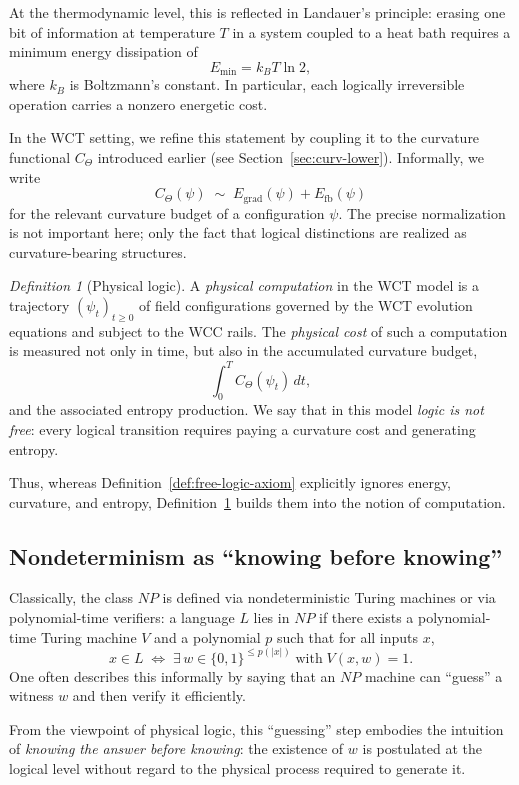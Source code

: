 \documentclass[12pt]{article}
\theoremstyle{remark}
\newtheorem{definition}[theorem]{Definition}
\begin{document}
At the thermodynamic level, this is reflected in Landauer's
principle: erasing one bit of information at temperature $T$ in a
system coupled to a heat bath requires a minimum energy dissipation of
\[
  E_{\min} = k_B T \ln 2,
\]
where $k_B$ is Boltzmann's constant. In particular, each logically
irreversible operation carries a nonzero energetic cost.

In the WCT setting, we refine this statement by coupling it to the
curvature functional $C_\Theta$ introduced earlier (see
Section~\ref{sec:curv-lower}). Informally, we write
\[
  C_\Theta(\psi) \;\sim\; E_{\mathrm{grad}}(\psi) + E_{\mathrm{fb}}(\psi)
\]
for the relevant curvature budget of a configuration $\psi$. The
precise normalization is not important here; only the fact that
logical distinctions are realized as curvature-bearing structures.

\begin{definition}[Physical logic]
\label{def:physical-logic}
A \emph{physical computation} in the WCT model is a trajectory
$(\psi_t)_{t \ge 0}$ of field configurations governed by the WCT
evolution equations and subject to the WCC rails. The \emph{physical
cost} of such a computation is measured not only in time, but also in
the accumulated curvature budget,
\[
  \int_0^T C_\Theta(\psi_t)\,dt,
\]
and the associated entropy production.
We say that in this model \emph{logic is not free}: every logical
transition requires paying a curvature cost and generating entropy.
\end{definition}

Thus, whereas Definition~\ref{def:free-logic-axiom} explicitly ignores
energy, curvature, and entropy, Definition~\ref{def:physical-logic}
builds them into the notion of computation.

\subsection{Nondeterminism as ``knowing before knowing''}

Classically, the class $NP$ is defined via nondeterministic Turing
machines or via polynomial-time verifiers: a language $L$ lies in $NP$
if there exists a polynomial-time Turing machine $V$ and a polynomial
$p$ such that for all inputs $x$,
\[
  x \in L \;\Longleftrightarrow\; \exists\,w \in \{0,1\}^{\le p(|x|)}
  \;\text{with}\; V(x,w) = 1.
\]
One often describes this informally by saying that an $NP$ machine
can ``guess'' a witness $w$ and then verify it efficiently.

From the viewpoint of physical logic, this ``guessing'' step embodies
the intuition of \emph{knowing the answer before knowing}: the
existence of $w$ is postulated at the logical level without regard to
the physical process required to generate it.
\end{document}
